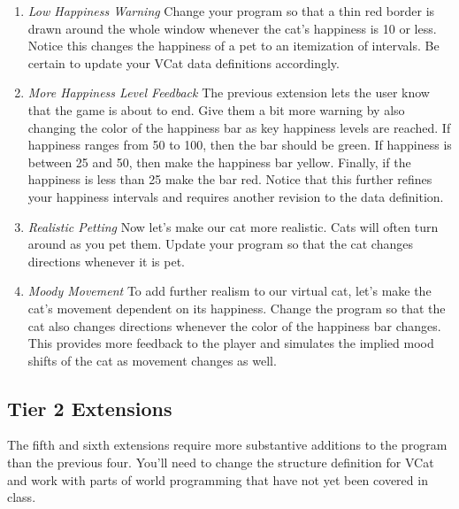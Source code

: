 \documentclass[nobib]{tufte-handout}
\begin{document}
\begin{enumerate}
  \item \textit{Low Happiness Warning}
  \newline
  Change your program so that a thin red border is drawn around the whole window whenever the cat's happiness is 10 or less. Notice this changes the happiness of a pet to an itemization of intervals. Be certain to update your VCat data definitions accordingly.


  \item \textit{More Happiness Level Feedback}
  \newline
   The previous extension lets the user know that the game is about to end. Give them a bit more warning by also changing the color of the happiness bar as key happiness levels are reached. If happiness ranges from 50 to 100, then the bar should be green.  If happiness is between 25 and 50, then make the happiness bar yellow. Finally, if the happiness is less than 25 make the bar red. Notice that this further refines your happiness intervals and requires another revision to the data definition.


  \item \textit{Realistic Petting}
  \newline
   Now let's make our cat more realistic. Cats will often turn around as you pet them. Update your program so that the cat changes directions whenever it is pet.

  \item \textit{Moody Movement}
  \newline
   To add further realism to our virtual cat, let's make the cat's movement dependent on its happiness. Change the program so that the cat also changes directions whenever the color of the happiness bar changes. This provides more feedback to the player and simulates the implied mood shifts of the cat as movement changes as well.
\end{enumerate}

\subsection*{Tier 2 Extensions}

The fifth and sixth extensions require more substantive additions to the program than the previous four. You'll need to change the structure definition for VCat and work with parts of world programming that have not yet been covered in class.
\end{document}
